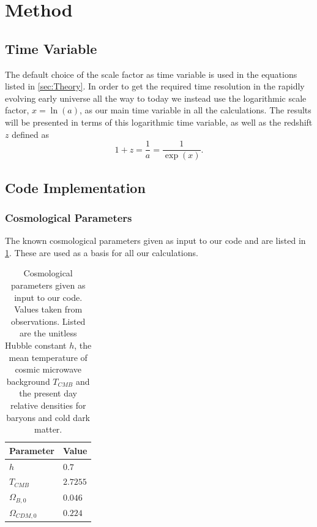 \documentclass[10pt,a4paper]{article}
\begin{document}
\section{Method}
\label{sec:Method}
\subsection{Time Variable}
\label{subsec:Method/Time variable}
The default choice of the scale factor as time variable is used in the equations listed in \cref{sec:Theory}. In order to get the required time resolution in the rapidly evolving early universe all the way to today we instead use the logarithmic scale factor, $x= \ln(a)$, as our main time variable in all the calculations. The results will be presented in terms of this logarithmic time variable, as well as the redshift $z$ defined as
%
\begin{equation}
    1+z = \frac{1}{a} = \frac{1}{\exp(x)}.
    \label{eq:redshift}
\end{equation}

\subsection{Code Implementation}
\label{subsec:Method/Code Implementation}

\subsubsection{Cosmological Parameters}
\label{subsubsec:Method/Cosmological parameters}
The known cosmological parameters given as input to our code and are listed in \cref{tab:input_parameters}. These are used as a basis for all our calculations.
%
\begin{table}[h]
    \centering
    \begin{tabular}{|l|l|}
    \hline
    Parameter      & Value    \\ \hline
    $h$            & $0.7$    \\ \hline
    $T_{CMB}$      & $2.7255$ \\ \hline
    $\Omega_{B,0}$     & $0.046$  \\ \hline
    $\Omega_{CDM,0}$ & $0.224$  \\ \hline
    \end{tabular}
    \caption{Cosmological parameters given as input to our code. Values taken from observations. Listed are the unitless Hubble constant $h$, the mean temperature of cosmic microwave background $T_{CMB}$ and the present day relative densities for baryons and cold dark matter.}
    \label{tab:input_parameters}
\end{table}
%
\end{document}
